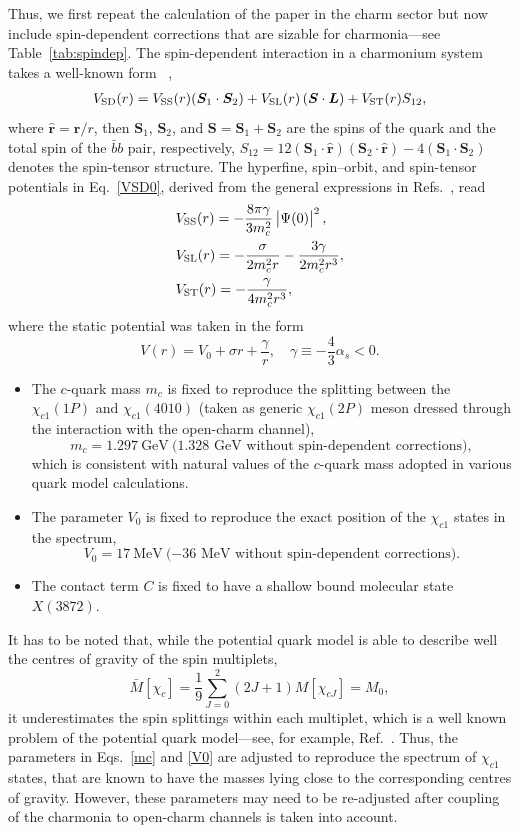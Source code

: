 \documentclass[aps,prl,showpacs,amsmath,onecolumn,superscriptaddress,floatfix,nofootinbib,notitlepage]{revtex4-2}
\newcommand{\ver}{{\bm r}}
\newcommand{\be}{\begin{equation}}
\newcommand{\ee}{\end{equation}}
\newcommand{\veL}{{\bm L}}
\newcommand{\veS}{{\bm S}}
\newcommand{\X}{X(3872)}
\begin{document}
Thus, we first repeat the calculation of the paper \cite{Zhang:2026iyr} in the charm sector but now include spin-dependent corrections that are sizable for charmonia---see Table~\ref{tab:spindep}. The spin-dependent interaction in a charmonium system takes a well-known form ~\cite{Eichten:1980mw,Gromes:1984ma},
\be
\begin{split}
	V_{\rm SD}(r)=V_{\rm SS}(r)(\veS_1\cdot\veS_2)+V_{\rm SL}(r)\left(\veS\cdot\veL\right)
	+V_{\rm ST}(r)S_{12},
	\label{VSD0}
\end{split}
\ee
where $\hat \ver=\ver/r$, then $\veS_1$, $\veS_2$, and $\veS=\veS_1+\veS_2$ are the spins of the quark and the total spin of the $\bar{b}b$ pair, respectively, $S_{12}=12(\veS_1\cdot\hat\ver)(\veS_2\cdot\hat\ver)-4(\veS_1\cdot\veS_2)$ denotes the spin-tensor structure. The hyperfine, spin--orbit, and spin-tensor potentials in Eq.~\eqref{VSD0}, derived from the general expressions in Refs.~\cite{Eichten:1980mw,Gromes:1984ma}, read
\be
\begin{split}
	 & V_{\rm SS}(r)=-\frac{8\pi\gamma}{3m_c^2}\left|\Psi(0)\right|^2,  \\
	 & V_{\rm SL}(r)=-\frac{\sigma}{2m_c^2r}-\frac{3\gamma}{2m_c^2r^3}, \\
	 & V_{\rm ST}(r)=-\frac{\gamma}{4m_c^2r^3},
\end{split}
\label{VSD}
\ee
where the static potential was taken in the form
\be
V(r)=V_0+\sigma r+\frac{\gamma}{r},\quad \gamma\equiv-\frac43\alpha_s<0.
\label{Cornell}
\ee

\begin{itemize}
	\item The $c$-quark mass $m_c$ is fixed to reproduce the splitting between the $\chi_{c1}(1P)$ and $\chi_{c1}(4010)$ (taken as generic $\chi_{c1}(2P)$ meson dressed through the interaction with the open-charm channel),
	      \be
	      m_c=1.297~\mbox{GeV}~\mbox{(1.328 GeV without spin-dependent corrections)},
	      \label{mc}
	      \ee
	      which is consistent with natural values of the $c$-quark mass adopted in various quark model calculations.
	\item The parameter $V_0$ is fixed to reproduce the exact position of the $\chi_{c1}$ states in the spectrum,
	      \be
	      V_0=17~\mbox{MeV}~\mbox{($-36$ MeV without spin-dependent corrections)}.
	      \label{V0}
	      \ee
	\item The contact term $C$ is fixed to have a shallow bound molecular state $\X$.
\end{itemize}
It has to be noted that, while the potential quark model is able to describe well the centres of gravity of the spin multiplets,
\be
\bar{M}[\chi_c]=\frac{1}{9}
\sum_{J=0}^2(2J+1)M[\chi_{cJ}]=M_0,
\label{chis}
\ee
it underestimates the spin splittings within each multiplet, which is a well known problem of the potential quark model---see, for example, Ref.~\cite{Franzini:1992nk}. Thus, the parameters in Eqs.~\eqref{mc} and \eqref{V0} are adjusted to reproduce the spectrum of $\chi_{c1}$ states, that are known to have the masses lying close to the corresponding centres of gravity. However, these parameters may need to be re-adjusted after coupling of the charmonia to open-charm channels is taken into account.
\end{document}
